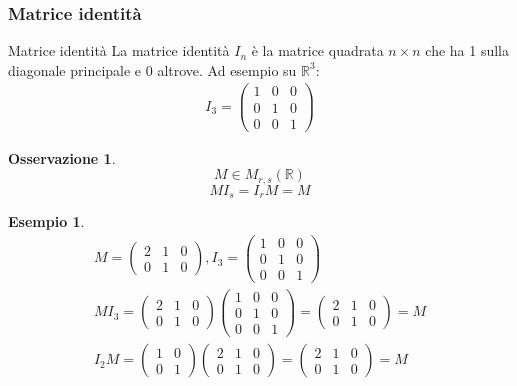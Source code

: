 \documentclass[a4paper]{article}
\theoremstyle{definition}
\newtheorem*{oss}{Osservazione}
\newtheorem*{es}{Esempio}
\begin{document}
\subsubsection{Matrice identità}
\begin{deff}{Matrice identità}{}
	La matrice identità $I_n$ è la matrice quadrata $n \times n$ che ha 1 sulla diagonale principale e 0 altrove.
	Ad esempio su $\mathbb{R}^3$:
	\begin{align*}
		I_3 = \begin{pmatrix}
			      1 & 0 & 0 \\
			      0 & 1 & 0 \\
			      0 & 0 & 1
		      \end{pmatrix}
	\end{align*}
\end{deff}
\begin{oss}
	\[ M \in M_{r, s}(\mathbb{R}) \]
	\[ MI_s = I_rM = M \]
\end{oss}
\begin{es}
	\begin{align*}
		M = \begin{pmatrix}
			2 & 1 & 0 \\
			0 & 1 & 0
		\end{pmatrix},
		I_3 = \begin{pmatrix}
			1 & 0 & 0 \\
			0 & 1 & 0 \\
			0 & 0 & 1
		\end{pmatrix} \\
		MI_3 = \begin{pmatrix}
			2 & 1 & 0 \\
			0 & 1 & 0
		\end{pmatrix} \begin{pmatrix}
			1 & 0 & 0 \\
			0 & 1 & 0 \\
			0 & 0 & 1
		\end{pmatrix} = \begin{pmatrix}
			2   & 1   & 0   \\
			0   & 1   & 0
		\end{pmatrix} = M \\
		I_2M = \begin{pmatrix}
			1 & 0 \\
			0 & 1
		\end{pmatrix} \begin{pmatrix}
			2 & 1 & 0 \\
			0 & 1 & 0
		\end{pmatrix} = \begin{pmatrix}
			2   & 1   & 0   \\
			0   & 1   & 0
		\end{pmatrix} = M
	\end{align*}
\end{es}
\end{document}
